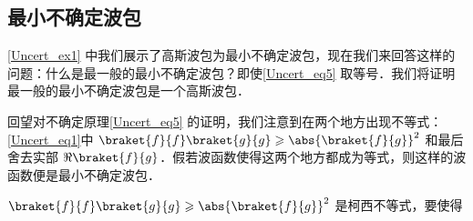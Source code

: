 \subsection{最小不确定波包}
\autoref{Uncert_ex1} 中我们展示了高斯波包为最小不确定波包，现在我们来回答这样的问题：什么是最一般的最小不确定波包？即使\autoref{Uncert_eq5} 取等号．我们将证明最一般的最小不确定波包是一个高斯波包．

回望对不确定原理\autoref{Uncert_eq5} 的证明，我们注意到在两个地方出现不等式：\autoref{Uncert_eq1}中 $\braket{f}{f} \braket{g}{g} \geqslant \abs{\braket{f}{g}}^2$ 和最后舍去实部 $\Re\braket{f}{g}$．假若波函数使得这两个地方都成为等式，则这样的波函数便是最小不确定波包．

$\braket{f}{f} \braket{g}{g} \geqslant \abs{\braket{f}{g}}^2$ 是柯西不等式，要使得


